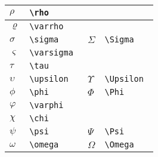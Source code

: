 \documentclass[brazilian]{beamer}
\begin{document}
\begin{frame}[fragile]
\begin{table}
\begin{tabular}{O{1.5cm}l||O{1.5cm}l}
            \(\rho \) & \lstinline[style=myStyleLatex]!\rho ! & & \\ \hline
            \(\varrho \) & \lstinline[style=myStyleLatex]!\varrho ! & & \\ \hline
            \(\sigma \) & \lstinline[style=myStyleLatex]!\sigma ! & \(\Sigma \) & \lstinline[style=myStyleLatex]!\Sigma ! \\ \hline
            \(\varsigma \) & \lstinline[style=myStyleLatex]!\varsigma ! & & \\ \hline
            \(\tau \) & \lstinline[style=myStyleLatex]!\tau ! & & \\ \hline
            \(\upsilon \) & \lstinline[style=myStyleLatex]!\upsilon ! & \(\Upsilon \) & \lstinline[style=myStyleLatex]!\Upsilon ! \\ \hline
            \(\phi \) & \lstinline[style=myStyleLatex]!\phi ! & \(\Phi \) & \lstinline[style=myStyleLatex]!\Phi ! \\ \hline
            \(\varphi \) & \lstinline[style=myStyleLatex]!\varphi ! & & \\ \hline
            \(\chi \) & \lstinline[style=myStyleLatex]!\chi ! & & \\ \hline
            \(\psi \) & \lstinline[style=myStyleLatex]!\psi ! & \(\Psi \) & \lstinline[style=myStyleLatex]!\Psi ! \\ \hline
            \(\omega \) & \lstinline[style=myStyleLatex]!\omega ! & \(\Omega \) & \lstinline[style=myStyleLatex]!\Omega ! \\ \hline
        \end{tabular}
    \end{table}

\end{frame}
\end{document}
